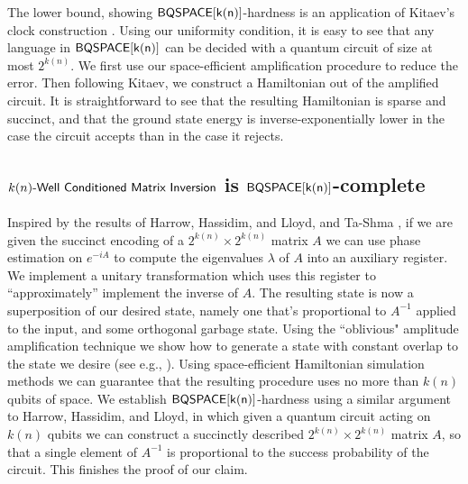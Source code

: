 \documentclass[11pt]{article}
\newtheorem{definition}[lemma]{Definition}
\numberwithin{lemma}{section}
\theoremstyle{definition}
\newcommand\BQSPACE{\sf{BQSPACE}}
\renewcommand{\geq}{\geqslant}
\newcommand\matrixinversion[1]{#1\textit{\sf{-Well Conditioned Matrix Inversion}}}
\begin{document}
The lower bound, showing $\BQSPACE[k(n)]$-hardness is an application of Kitaev's clock construction \cite{ksv02}.  Using our uniformity condition, it is easy to see that any language in $\BQSPACE[k(n)]$ can be decided with a quantum circuit of size at most $2^{k(n)}$.  We first use our space-efficient  amplification procedure to reduce the error.  Then following Kitaev, we construct a Hamiltonian out of the amplified circuit.  It is straightforward to see that the resulting Hamiltonian is sparse and succinct, and that the ground state energy is inverse-exponentially lower in the case the circuit accepts than in the case it rejects.
\subsection{$\matrixinversion{k(n)}$ is $\BQSPACE[k(n)]$-complete}
Inspired by the results of Harrow, Hassidim, and Lloyd, and Ta-Shma \cite{HHL,tashma}, if we are given the succinct encoding of a $2^{k(n)} \times 2^{k(n)}$ matrix $A$ we can use phase estimation on $e^{-iA}$ to compute the eigenvalues $\lambda$ of $A$ into an auxiliary register.  We implement a unitary transformation which uses this register to ``approximately'' implement the inverse of $A$.  The resulting state is now a superposition of  our desired state, namely one that's proportional to $A^{-1}$ applied to the input, and some orthogonal garbage state.  Using the ``oblivious" amplitude amplification technique we show how to generate a state with constant overlap to the state we desire (see e.g., \cite{berry14,berry15}).  Using space-efficient Hamiltonian simulation methods we can guarantee that the resulting procedure uses no more than $k(n)$ qubits of space.
We establish $\BQSPACE[k(n)]$-hardness using a similar argument to Harrow, Hassidim, and Lloyd, in which given a quantum circuit acting on $k(n)$ qubits we can construct a succinctly described $2^{k(n)}\times 2^{k(n)}$ matrix $A$, so that a single element of $A^{-1}$ is proportional to the success probability of the circuit.  This finishes the proof of our claim.  
\end{document}
